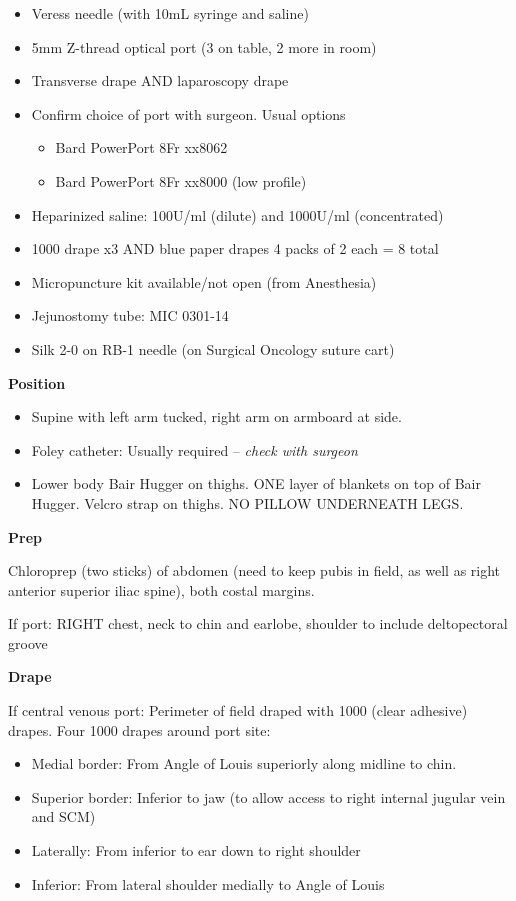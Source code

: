 \documentclass[
]{book}
\providecommand{\tightlist}{%
  \setlength{\itemsep}{0pt}\setlength{\parskip}{0pt}}
\begin{document}
\begin{itemize}
\tightlist
\item
  Veress needle (with 10mL syringe and saline)
\item
  5mm Z-thread optical port (3 on table, 2 more in room)
\item
  Transverse drape AND laparoscopy drape
\item
  Confirm choice of port with surgeon. Usual options

  \begin{itemize}
  \tightlist
  \item
    Bard PowerPort 8Fr xx8062
  \item
    Bard PowerPort 8Fr xx8000 (low profile)
  \end{itemize}
\item
  Heparinized saline: 100U/ml (dilute) and 1000U/ml (concentrated)
\item
  1000 drape x3 AND blue paper drapes 4 packs of 2 each = 8 total
\item
  Micropuncture kit available/not open (from Anesthesia)
\item
  Jejunostomy tube: MIC 0301-14
\item
  Silk 2-0 on RB-1 needle (on Surgical Oncology suture cart)
\end{itemize}

\textbf{Position}

\begin{itemize}
\tightlist
\item
  Supine with left arm tucked, right arm on armboard at side.
\item
  Foley catheter: Usually required -- \emph{check with surgeon}
\item
  Lower body Bair Hugger on thighs. ONE layer of blankets on top of Bair Hugger. Velcro strap on thighs. NO PILLOW UNDERNEATH LEGS.
\end{itemize}

\textbf{Prep}

Chloroprep (two sticks) of abdomen (need to keep pubis in field, as well as right anterior superior iliac spine), both costal margins.

If port: RIGHT chest, neck to chin and earlobe, shoulder to include deltopectoral groove

\textbf{Drape}

If central venous port: Perimeter of field draped with 1000 (clear adhesive) drapes. Four 1000 drapes around port site:

\begin{itemize}
\tightlist
\item
  Medial border: From Angle of Louis superiorly along midline to chin.
\item
  Superior border: Inferior to jaw (to allow access to right internal jugular vein and SCM)
\item
  Laterally: From inferior to ear down to right shoulder
\item
  Inferior: From lateral shoulder medially to Angle of Louis
\end{itemize}
\end{document}
